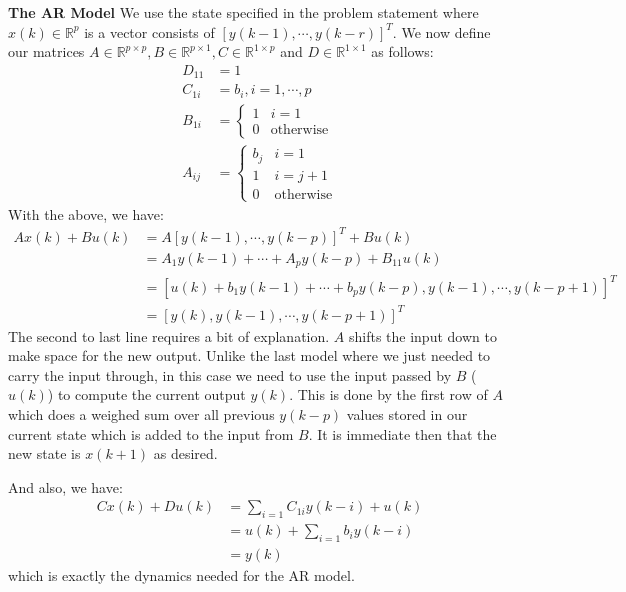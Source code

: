 \documentclass[12pt]{exam}
\begin{document}
\begin{questions}
\begin{solution}
\textbf{The AR Model}
We use the state specified in the problem statement where $x(k) \in \mathbb{R}^p$ is a vector consists of $[y(k-1),\cdots, y(k-r)]^T$. We now define our matrices $A \in \mathbb{R}^{p \times p}, B \in \mathbb{R}^{p \times 1}, C \in \mathbb{R}^{1 \times p}$ and $D \in \mathbb{R}^{1 \times 1}$ as follows:
\begin{align*}
  D_{11} &= 1 \\
  C_{1i} &= b_i, i = 1, \cdots, p \\
  B_{1i} &=
    \begin{cases}
      1 & i = 1 \\
      0 & \text{otherwise}
    \end{cases} \\
  A_{ij} &= 
    \begin{cases}
      b_j & i = 1 \\
      1 & i = j + 1 \\
      0 & \text{otherwise}
    \end{cases} 
\end{align*}
With the above, we have:
\begin{align*}
  Ax(k) + Bu(k) &= A[y(k-1), \cdots, y(k-p)]^T + Bu(k) \\
  &= A_1y(k-1) + \cdots + A_p y(k - p) + B_{11}u(k) \tag{Definition of matrix multiplication} \\
  &= [u(k) + b_1y(k-1) + \cdots + b_py(k-p), y(k-1), \cdots, y(k-p + 1)]^T \\
  &= [y(k), y(k-1), \cdots, y(k - p + 1)]^T
\end{align*}
The second to last line requires a bit of explanation. $A$ shifts the input down to make space for the new output. Unlike the last model where we just needed to carry the input through, in this case we need to use the input passed by $B$ ($u(k)$) to compute the current output $y(k)$. This is done by the first row of $A$ which does a weighed sum over all previous $y(k - p)$ values stored in our current state which is added to the input from $B$. It is immediate then that the new state is $x(k+1)$ as desired. 

And also, we have:
\begin{align*}
  Cx(k) + Du(k) &= \sum_{i=1} C_{1i} y(k-i) + u(k) \tag{Definition of matrix multiplication} \\
  &= u(k) + \sum_{i=1} b_i y(k - i) \\
  &= y(k)
\end{align*}
which is exactly the dynamics needed for the AR model.


\end{solution}
\end{questions}
\end{document}
